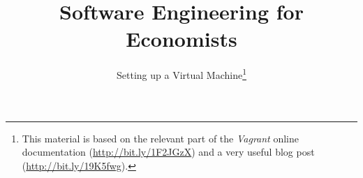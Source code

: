 \title{Software Engineering for Economists}
\subtitle{Setting up a Virtual Machine\footnote{ This material is based on the relevant part of the \textit{Vagrant} online documentation (\url{http://bit.ly/1F2JGzX}) and a very useful blog post (\url{http://bit.ly/19K5fwg}). }}
\date{} 

